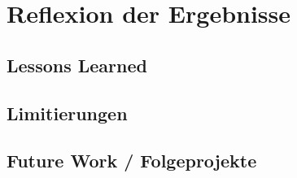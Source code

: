 \newpage
\section{Reflexion der Ergebnisse} \label{fazit}

\subsection{Lessons Learned}

\subsection{Limitierungen}

\subsection{Future Work / Folgeprojekte}
